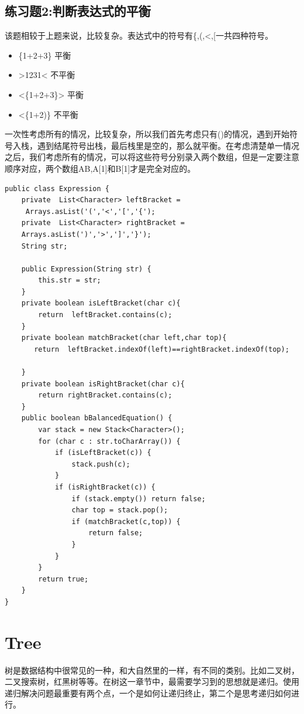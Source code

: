 \documentclass[
	11pt,
	fleqn,
	a4paper,
]{LegrandOrangeBook}
\begin{document}
\section{练习题2:判断表达式的平衡}
\begin{example}
    该题相较于上题来说，比较复杂。表达式中的符号有\{,(,<,[一共四种符号。
    \begin{itemize}
        \item \{1+2+3\} 平衡
        \item >1231< 不平衡
        \item <\{1+2+3\}> 平衡
        \item <\{1+2)\} 不平衡
    \end{itemize}
    一次性考虑所有的情况，比较复杂，所以我们首先考虑只有()的情况，遇到开始符号入栈，遇到结尾符号出栈，最后栈里是空的，那么就平衡。在考虑清楚单一情况之后，我们考虑所有的情况，可以将这些符号分别录入两个数组，但是一定要注意顺序对应，两个数组AB,A[1]和B[1]才是完全对应的。
    \begin{verbatim}
public class Expression {
    private  List<Character> leftBracket =
     Arrays.asList('(','<','[','{');
    private  List<Character> rightBracket =
    Arrays.asList(')','>',']','}');
    String str;

    public Expression(String str) {
        this.str = str;
    }
    private boolean isLeftBracket(char c){
        return  leftBracket.contains(c);
    }
    private boolean matchBracket(char left,char top){
       return  leftBracket.indexOf(left)==rightBracket.indexOf(top);

    }
    private boolean isRightBracket(char c){
        return rightBracket.contains(c);
    }
    public boolean bBalancedEquation() {
        var stack = new Stack<Character>();
        for (char c : str.toCharArray()) {
            if (isLeftBracket(c)) {
                stack.push(c);
            }
            if (isRightBracket(c)) {
                if (stack.empty()) return false;
                char top = stack.pop();
                if (matchBracket(c,top)) {
                    return false;
                }
            }
        }
        return true;
    }
}

    \end{verbatim}
\end{example}
\chapter{Tree}

树是数据结构中很常见的一种，和大自然里的一样，有不同的类别。比如二叉树，二叉搜索树，红黑树等等。在树这一章节中，最需要学习到的思想就是递归。使用递归解决问题最重要有两个点，一个是如何让递归终止，第二个是思考递归如何进行。
\end{document}
